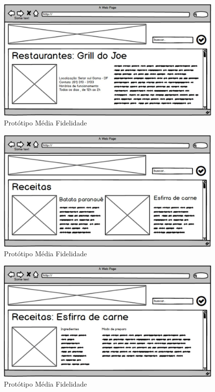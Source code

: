 \begin{figure}[H]
	\begin{center}
		\includegraphics[keepaspectratio,scale=0.3]{figuras/media_fidelidade/prototipo5.eps}
		\caption{Protótipo Média Fidelidade}
	\end{center}
\end{figure}

\begin{figure}[H]
	\begin{center}
		\includegraphics[keepaspectratio,scale=0.3]{figuras/media_fidelidade/prototipo6.eps}
		\caption{Protótipo Média Fidelidade}
	\end{center}
\end{figure}

\begin{figure}[H]
	\begin{center}
		\includegraphics[keepaspectratio,scale=0.3]{figuras/media_fidelidade/prototipo7.eps}
		\caption{Protótipo Média Fidelidade}
	\end{center}
\end{figure}




